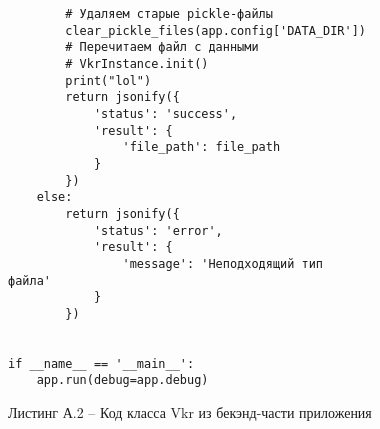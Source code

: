 \begin{verbatim}
        # Удаляем старые pickle-файлы
        clear_pickle_files(app.config['DATA_DIR'])
        # Перечитаем файл с данными
        # VkrInstance.init()
        print("lol")
        return jsonify({
            'status': 'success',
            'result': {
                'file_path': file_path
            }
        })
    else:
        return jsonify({
            'status': 'error',
            'result': {
                'message': 'Неподходящий тип 
файла'
            }
        })


if __name__ == '__main__':
    app.run(debug=app.debug)

\end{verbatim}
\vspace{8mm}
\Large
\par
Листинг А.2 -- Код класса Vkr из бекэнд-части приложения
\vspace{8mm}
\large

